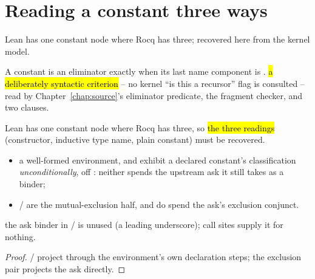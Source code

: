 \section{Reading a constant three ways}
\label{sec:eraser:origin}
Lean has one constant node where Rocq has three; recovered here from the kernel model.

\begin{definition}
\label{def:isCasesOnName}
\leanok
{} A constant is an eliminator exactly when its last name component is
.
 \hl{a deliberately syntactic criterion} -- no kernel ``is this a recursor'' flag is
consulted -- read by Chapter~\ref{chap:source}'s eliminator predicate, the fragment checker, and
two  clauses.
\end{definition}

\begin{lemma}
\label{lem:consts_classified}
\leanok
{} Lean has one constant node where Rocq has three, so \hl{the three readings}
(constructor, inductive type name, plain constant) must be recovered.
\begin{itemize}
\item {} a well-formed environment,  and
 exhibit a declared constant's classification
\emph{unconditionally}, off : neither spends the upstream ask it still
takes as a binder;
\item {}/ are the mutual-exclusion
half, and do spend the ask's exclusion conjunct.
\end{itemize}
 the ask binder in / is
unused (a leading underscore); call sites supply it for nothing.
\end{lemma}
\begin{proof}
\leanok
{}
 / project 
through the environment's own declaration steps; the exclusion pair projects the ask directly.
\end{proof}

